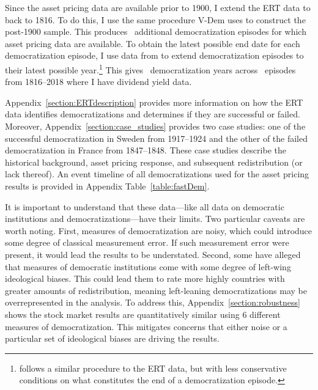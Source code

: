 Since the asset pricing data are available prior to 1900, I extend the ERT data to back to 1816. To do this, I use the same procedure V-Dem uses to construct the post-1900 sample. This produces \demEpisodesPre\ additional democratization episodes for which asset pricing data are available. To obtain the latest possible end date for each democratization episode, I use data from \cite{Lindberg2018} to extend democratization episodes to their latest possible year.\footnote{\cite{Lindberg2018} follows a similar procedure to the ERT data, but with less conservative conditions on what constitutes the end of a democratization episode.} This gives \demYears\ democratization years across \demEpisodes\ episodes from 1816--2018 where I have dividend yield data.

Appendix~\ref{section:ERTdescription} provides more information on how the ERT data identifies democratizations and determines if they are successful or failed. Moreover, Appendix~\ref{section:case_studies} provides two case studies: one of the successful democratization in Sweden from 1917--1924 and the other of the failed democratization in France from 1847--1848. These case studies describe the historical background, asset pricing response, and subsequent redistribution (or lack thereof). An event timeline of all democratizations used for the asset pricing results is provided in Appendix Table~\ref{table:fastDem}.

\label{par:democratization_limit}
It is important to understand that these data---like all data on democratic institutions and democratizations---have their limits. Two particular caveats are worth noting. First, measures of democratization are noisy, which could introduce some degree of classical measurement error. If such measurement error were present, it would lead the results to be understated. Second, some have alleged that measures of democratic institutions come with some degree of left-wing ideological biases. This could lead them to rate more highly countries with greater amounts of redistribution, meaning left-leaning democratizations may be overrepresented in the analysis.  To address this, Appendix~\ref{section:robustness} shows the stock market results are quantitatively similar using 6 different measures of democratization.  This mitigates concerns that either noise or a particular set of ideological biases are driving the results.